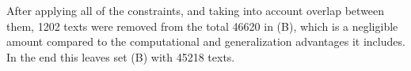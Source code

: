 After applying all of the constraints, and taking into account
overlap between them, 1202 texts were removed from the total 46620 in (B),
which is a negligible amount compared to the computational and generalization
advantages it includes.
In the end this leaves set (B) with 45218 texts.

\begin{figure}[htb]
\begin{minipage}{.5\linewidth}
\centering
{}
\end{minipage}%
\begin{minipage}{.5\linewidth}
\centering
{}

\end{minipage}
\end{figure}
